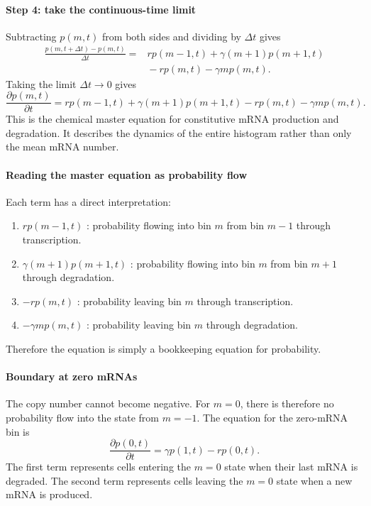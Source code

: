 \paragraph{Step 4: take the continuous-time limit}
Subtracting $p(m,t)$ from both sides and dividing by $\Delta t$ gives
% 
\[
    \begin{aligned}
        \frac{p(m,t+\Delta t)-p(m,t)}{\Delta t}={}&rp(m-1,t)+\gamma(m+1)p(m+1,t)
        \\
        &{}-rp(m,t)-\gamma m p(m,t).
    \end{aligned}
\]
% 
Taking the limit $\Delta t\rightarrow0$ gives
% 
\begin{equation}
    \boxed{ \frac{\partial p(m,t)}{\partial t} = rp(m-1,t) + \gamma(m+1)p(m+1,t) - rp(m,t) - \gamma m p(m,t) }.
    \label{eq:mrna-master}
\end{equation}
% 
This is the chemical master equation for constitutive mRNA production and degradation.
It describes the dynamics of the entire histogram rather than only the mean mRNA number.
% 
% 
\paragraph{Reading the master equation as probability flow}
Each term has a direct interpretation:
\begin{enumerate}
    \item $rp(m-1,t)$ : probability flowing into bin $m$ from bin $m-1$ through transcription.
    \item $\gamma(m+1)p(m+1,t)$ : probability flowing into bin $m$ from bin $m+1$ through degradation.
    \item $-rp(m,t)$ : probability leaving bin $m$ through transcription.
    \item $-\gamma m p(m,t)$ : probability leaving bin $m$ through degradation.
\end{enumerate}
Therefore the equation is simply a bookkeeping equation for probability.
% 
% 
\paragraph{Boundary at zero mRNAs}
The copy number cannot become negative.
For $m=0$, there is therefore no probability flow into the state from $m=-1$.
The equation for the zero-mRNA bin is
\[
    \frac{\partial p(0,t)}{\partial t} = \gamma p(1,t) - rp(0,t).
\]
The first term represents cells entering the $m=0$ state when their last mRNA is degraded.
The second term represents cells leaving the $m=0$ state when a new mRNA is produced.
% 
% 
